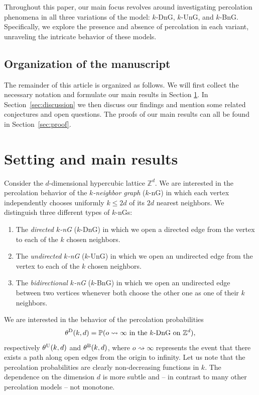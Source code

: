 \documentclass[a4paper, oneside, 11pt]{amsart}
\theoremstyle{definition}
\newcommand{\1}{\mathbbm{1}}
\newcommand{\0}{\mathbf{o}}
\numberwithin{equation}{section}
\begin{document}
Throughout this paper, our main focus revolves around investigating percolation phenomena in all three variations of the model: $k$-DnG, $k$-UnG, and $k$-BnG. Specifically, we explore the presence and absence of percolation in each variant, unraveling the intricate behavior of these models.

\subsection{Organization of the manuscript}
The remainder of this article is organized as follows.
We will first collect the necessary notation and formulate our main results in Section \ref{sec:set}.
In Section~\ref{sec:discussion} we then discuss our findings and mention some related conjectures and open questions.
The proofs of our main results can all be found in Section~\ref{sec:proof}. 

\section{Setting and main results}\label{sec:set}

Consider the $d$-dimensional hypercubic lattice $\mathbb Z^d$. We are interested in the percolation behavior of the {\em $k$-neighbor graph} ($k$-nG) in which each vertex independently chooses uniformly $k\le 2d$ of its $2d$ nearest neighbors. We distinguish three different types of $k$-nGs:
\begin{enumerate}
\item The {\em directed $k$-nG} ($k$-DnG) in which we open a directed edge from the vertex to each of the $k$ chosen neighbors. 
\item The {\em undirected $k$-nG} ($k$-UnG) in which we open an undirected edge from the vertex to each of the $k$ chosen neighbors.
\item The {\em bidirectional $k$-nG} ($k$-BnG) in which we open an undirected edge between two vertices whenever both choose the other one as one of their $k$ neighbors.
\end{enumerate}
We are interested in the behavior of the percolation probabilities 
\begin{equation}\label{thetaD}
\theta^{\rm D}(k,d)=\mathbb P(o\rightsquigarrow\infty \text{ in the $k$-DnG on $\mathbb Z^d$}),
\end{equation}
respectively $\theta^{\rm U}(k,d)$ and $\theta^{\rm B}(k,d)$, %
where $o\rightsquigarrow\infty$ represents the event that there exists a path along open edges from the origin to infinity. Let us note that the percolation probabilities are clearly non-decreasing functions in $k$. The dependence on the dimension $d$ is more subtle and – in contrast to many other percolation models – not monotone. 
\end{document}
